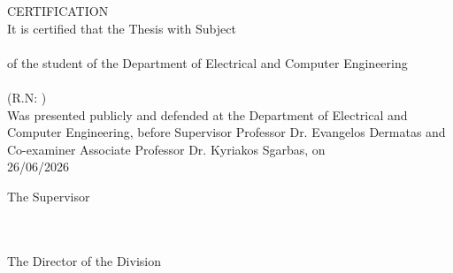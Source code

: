 \pagestyle{empty}
\begin{center}
{\LARGE CERTIFICATION\\[1cm]}
\large It is certified that the Thesis with Subject\\[1cm]
\textbf{\large \doctitle }\\[1cm]
of the student of the Department of Electrical and Computer Engineering\\[1.5cm]
\me \\[0.5cm]
(R.N: \studnum )\\[1.5cm]
Was presented publicly and defended at the Department of Electrical and Computer Engineering, before Supervisor Professor Dr. Evangelos Dermatas and Co-examiner Associate Professor Dr. Kyriakos Sgarbas, on\\[0.5cm]
\Large{26/06/2026}\\[1cm]
\end{center}
\begin{minipage}{0.5\textwidth}
\begin{flushleft} \large
The Supervisor\\[0.5cm]
\supname \\
\suptitle \\

\end{flushleft}
\end{minipage}
\begin{minipage}{0.5\textwidth}
\begin{flushright} \large
The Director of the Division\\[0.5cm]
\headofdivision\\
\emph{\headofdivisiontitle}
\end{flushright}
\end{minipage}
